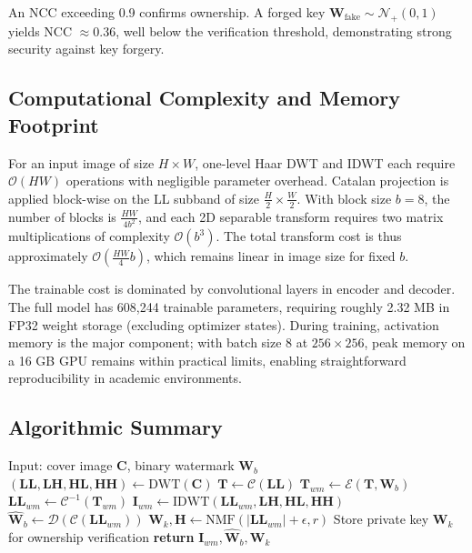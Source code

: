 \documentclass[journal]{IEEEtran}
\begin{document}
An NCC exceeding 0.9 confirms ownership. A forged key $\mathbf{W}_{\text{fake}}
\sim \mathcal{N}_+(0, 1)$ yields NCC $\approx 0.36$, well below the
verification threshold, demonstrating strong security against key forgery.

\subsection{Computational Complexity and Memory Footprint}

For an input image of size $H \times W$, one-level Haar DWT and IDWT each
require $\mathcal{O}(HW)$ operations with negligible parameter overhead.
Catalan projection is applied block-wise on the LL subband of size
$\frac{H}{2}\times\frac{W}{2}$. With block size $b=8$, the number of blocks
is $\frac{HW}{4b^2}$, and each 2D separable transform requires two matrix
multiplications of complexity $\mathcal{O}(b^3)$. The total transform cost is
thus approximately $\mathcal{O}(\frac{HW}{4}b)$, which remains linear in image
size for fixed $b$.

The trainable cost is dominated by convolutional layers in encoder and decoder.
The full model has 608,244 trainable parameters, requiring roughly 2.32 MB in
FP32 weight storage (excluding optimizer states). During training, activation
memory is the major component; with batch size 8 at $256\times256$, peak memory
on a 16 GB GPU remains within practical limits, enabling straightforward
reproducibility in academic environments.

\subsection{Algorithmic Summary}

\begin{algorithm}[!t]
\caption{CatNMF-Net Embedding and Verification}
\label{alg:catnmf}
\begin{algorithmic}[1]
\STATE Input: cover image $\mathbf{C}$, binary watermark $\mathbf{W}_b$
\STATE $(\mathbf{LL},\mathbf{LH},\mathbf{HL},\mathbf{HH}) \leftarrow \text{DWT}(\mathbf{C})$
\STATE $\mathbf{T} \leftarrow \mathcal{C}(\mathbf{LL})$ 
\STATE $\mathbf{T}_{wm} \leftarrow \mathcal{E}(\mathbf{T}, \mathbf{W}_b)$
\STATE $\mathbf{LL}_{wm} \leftarrow \mathcal{C}^{-1}(\mathbf{T}_{wm})$
\STATE $\mathbf{I}_{wm} \leftarrow \text{IDWT}(\mathbf{LL}_{wm},\mathbf{LH},\mathbf{HL},\mathbf{HH})$
\STATE $\hat{\mathbf{W}}_b \leftarrow \mathcal{D}(\mathcal{C}(\mathbf{LL}_{wm}))$
\STATE $\mathbf{W}_k,\mathbf{H} \leftarrow \text{NMF}(|\mathbf{LL}_{wm}|+\epsilon, r)$
\STATE Store private key $\mathbf{W}_k$ for ownership verification
\STATE \textbf{return} $\mathbf{I}_{wm}, \hat{\mathbf{W}}_b, \mathbf{W}_k$
\end{algorithmic}
\end{algorithm}
\end{document}

